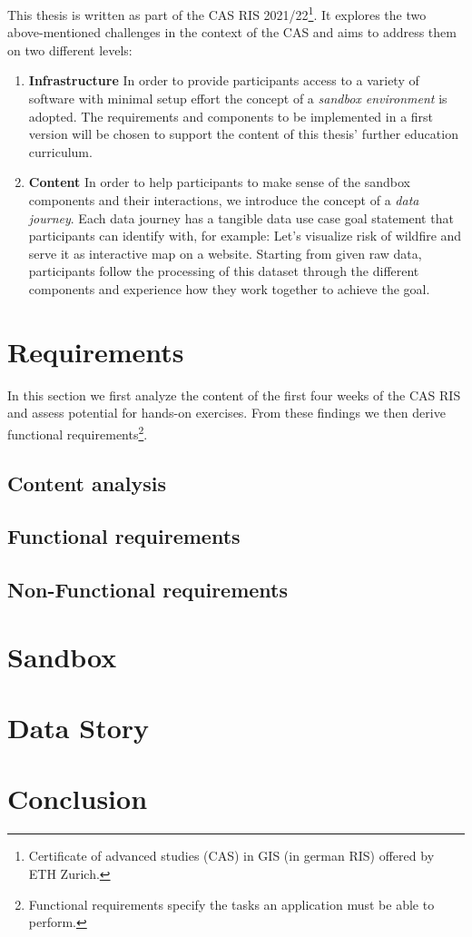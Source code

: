 \documentclass[12pt, a4paper, oneside, parskip=full*]{scrartcl}
\begin{document}
This thesis is written as part of the CAS RIS 2021/22\footnote{Certificate of advanced studies (CAS) in GIS (in german
RIS) offered by ETH Zurich.}. It explores the two above-mentioned challenges in the context of the CAS and aims to
address them on two different levels:
\begin{enumerate}
  \item \textbf{Infrastructure} In order to provide participants access to a variety of software with minimal setup
  effort the concept of a \emph{sandbox environment} is adopted. The requirements and components to be implemented in a
  first version will be chosen to support the content of this thesis' further education curriculum.
  \item \textbf{Content} In order to help participants to make sense of the sandbox components and their interactions,
  we introduce the concept of a \emph{data journey}. Each data journey has a tangible data use case goal statement that
  participants can identify with, for example: Let's visualize risk of wildfire and serve it as interactive map on a
  website. Starting from given raw data, participants follow the processing of this dataset through the different
  components and experience how they work together to achieve the goal.
\end{enumerate}


\section{Requirements}
In this section we first analyze the content of the first four weeks of the CAS RIS and assess potential for hands-on
exercises. From these findings we then derive functional requirements\footnote{Functional requirements specify the tasks
an application must be able to perform.}.


\subsection{Content analysis}


\subsection{Functional requirements}

\subsection{Non-Functional requirements}


\section{Sandbox}

\section{Data Story}

\section{Conclusion}
\end{document}
